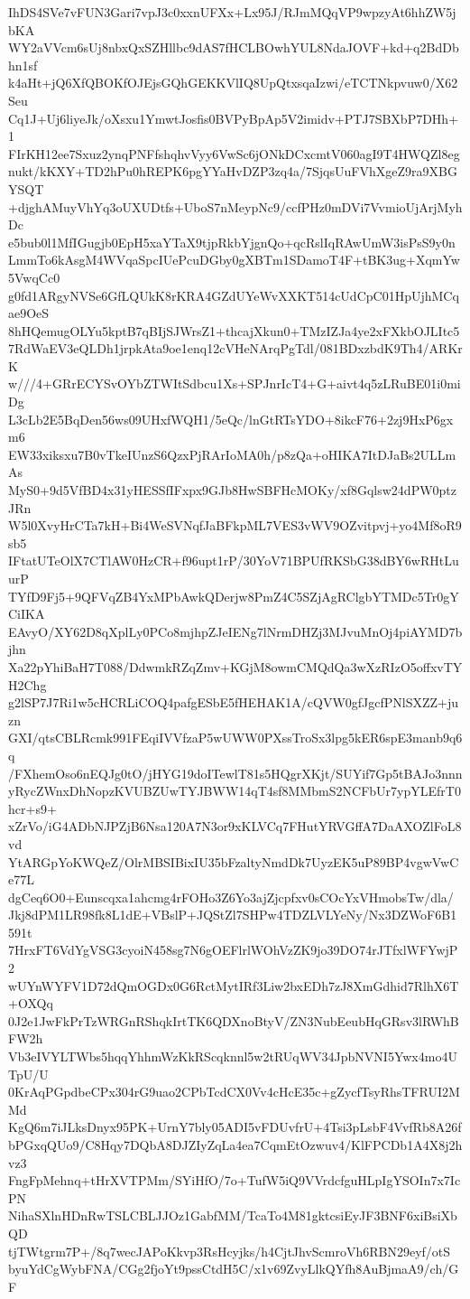 IhDS4SVe7vFUN3Gari7vpJ3c0xxnUFXx+Lx95J/RJmMQqVP9wpzyAt6hhZW5jbKA
WY2aVVcm6sUj8nbxQxSZHllbc9dAS7fHCLBOwhYUL8NdaJOVF+kd+q2BdDbhn1sf
k4aHt+jQ6XfQBOKfOJEjsGQhGEKKVlIQ8UpQtxsqaIzwi/eTCTNkpvuw0/X62Seu
Cq1J+Uj6liyeJk/oXsxu1YmwtJosfis0BVPyBpAp5V2imidv+PTJ7SBXbP7DHh+1
FIrKH12ee7Sxuz2ynqPNFfshqhvVyy6VwSc6jONkDCxcmtV060agI9T4HWQZl8eg
nukt/kKXY+TD2hPu0hREPK6pgYYaHvDZP3zq4a/7SjqsUuFVhXgeZ9ra9XBGYSQT
+djghAMuyVhYq3oUXUDtfs+UboS7nMeypNc9/ccfPHz0mDVi7VvmioUjArjMyhDc
e5bub0l1MfIGugjb0EpH5xaYTaX9tjpRkbYjgnQo+qcRslIqRAwUmW3isPsS9y0n
LmmTo6kAsgM4WVqaSpcIUePcuDGby0gXBTm1SDamoT4F+tBK3ug+XqmYw5VwqCc0
g0fd1ARgyNVSe6GfLQUkK8rKRA4GZdUYeWvXXKT514cUdCpC01HpUjhMCqae9OeS
8hHQemugOLYu5kptB7qBIjSJWrsZ1+thcajXkun0+TMzIZJa4ye2xFXkbOJLItc5
7RdWaEV3eQLDh1jrpkAta9oe1enq12cVHeNArqPgTdl/081BDxzbdK9Th4/ARKrK
w///4+GRrECYSvOYbZTWItSdbcu1Xs+SPJnrIcT4+G+aivt4q5zLRuBE01i0miDg
L3cLb2E5BqDen56ws09UHxfWQH1/5eQc/lnGtRTsYDO+8ikcF76+2zj9HxP6gxm6
EW33xiksxu7B0vTkeIUnzS6QzxPjRArIoMA0h/p8zQa+oHIKA7ItDJaBs2ULLmAs
MyS0+9d5VfBD4x31yHESSfIFxpx9GJb8HwSBFHcMOKy/xf8Gqlsw24dPW0ptzJRn
W5l0XvyHrCTa7kH+Bi4WeSVNqfJaBFkpML7VES3vWV9OZvitpvj+yo4Mf8oR9sb5
IFtatUTeOlX7CTlAW0HzCR+f96upt1rP/30YoV71BPUfRKSbG38dBY6wRHtLuurP
TYfD9Fj5+9QFVqZB4YxMPbAwkQDerjw8PmZ4C5SZjAgRClgbYTMDc5Tr0gYCiIKA
EAvyO/XY62D8qXplLy0PCo8mjhpZJeIENg7lNrmDHZj3MJvuMnOj4piAYMD7bjhn
Xa22pYhiBaH7T088/DdwmkRZqZmv+KGjM8owmCMQdQa3wXzRIzO5offxvTYH2Chg
g2lSP7J7Ri1w5cHCRLiCOQ4pafgESbE5fHEHAK1A/cQVW0gfJgcfPNlSXZZ+juzn
GXI/qtsCBLRcmk991FEqiIVVfzaP5wUWW0PXssTroSx3lpg5kER6spE3manb9q6q
/FXhemOso6nEQJg0tO/jHYG19doITewlT81s5HQgrXKjt/SUYif7Gp5tBAJo3nnn
yRycZWnxDhNopzKVUBZUwTYJBWW14qT4sf8MMbmS2NCFbUr7ypYLEfrT0hcr+s9+
xZrVo/iG4ADbNJPZjB6Nsa120A7N3or9xKLVCq7FHutYRVGffA7DaAXOZlFoL8vd
YtARGpYoKWQeZ/OlrMBSIBixIU35bFzaltyNmdDk7UyzEK5uP89BP4vgwVwCe77L
dgCeq6O0+Eunscqxa1ahcmg4rFOHo3Z6Yo3ajZjcpfxv0sCOcYxVHmobsTw/dla/
Jkj8dPM1LR98fk8L1dE+VBslP+JQStZl7SHPw4TDZLVLYeNy/Nx3DZWoF6B1591t
7HrxFT6VdYgVSG3cyoiN458sg7N6gOEFlrlWOhVzZK9jo39DO74rJTfxlWFYwjP2
wUYnWYFV1D72dQmOGDx0G6RctMytIRf3Liw2bxEDh7zJ8XmGdhid7RlhX6T+OXQq
0J2e1JwFkPrTzWRGnRShqkIrtTK6QDXnoBtyV/ZN3NubEeubHqGRsv3lRWhBFW2h
Vb3eIVYLTWbs5hqqYhhmWzKkRScqknnl5w2tRUqWV34JpbNVNI5Ywx4mo4UTpU/U
0KrAqPGpdbeCPx304rG9uao2CPbTcdCX0Vv4cHcE35c+gZycfTsyRhsTFRUI2MMd
KgQ6m7iJLksDnyx95PK+UrnY7bly05ADI5vFDUvfrU+4Tsi3pLsbF4VvfRb8A26f
bPGxqQUo9/C8Hqy7DQbA8DJZIyZqLa4ea7CqmEtOzwuv4/KlFPCDb1A4X8j2hvz3
FngFpMehnq+tHrXVTPMm/SYiHfO/7o+TufW5iQ9VVrdcfguHLpIgYSOIn7x7IcPN
NihaSXlnHDnRwTSLCBLJJOz1GabfMM/TcaTo4M81gktcsiEyJF3BNF6xiBsiXbQD
tjTWtgrm7P+/8q7wecJAPoKkvp3RsHcyjks/h4CjtJhvScmroVh6RBN29eyf/otS
byuYdCgWybFNA/CGg2fjoYt9pssCtdH5C/x1v69ZvyLlkQYfh8AuBjmaA9/ch/GF
